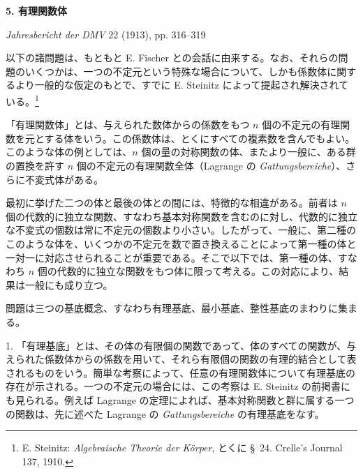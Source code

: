 \documentclass[11pt]{jlreq}
\begin{document}
\providecommand{\Kfield}{\mathfrak{K}}
\providecommand{\Ssys}{\mathfrak{S}}
\providecommand{\Mfield}{\mathfrak{M}}
\providecommand{\tq}{\tau}
\providecommand{\Lsys}{\mathfrak{L}}
\providecommand{\Jdom}{\mathfrak{J}}
\providecommand{\ds}{\displaystyle}

\begin{center}
{\Large\bfseries 5. 有理関数体}\par
\vspace{1.2em}
\emph{Jahresbericht der DMV} 22 (1913), pp. 316--319
\end{center}

\vspace{1.5em}

以下の諸問題は、もともと E. Fischer との会話に由来する。なお、それらの問題のいくつかは、一つの不定元という特殊な場合について、しかも係数体に関するより一般的な仮定のもとで、すでに E. Steinitz によって提起され解決されている。\footnote{E. Steinitz: \emph{Algebraische Theorie der Körper}, とくに \S\ 24. Crelle's Journal 137, 1910.}

「有理関数体」とは、与えられた数体からの係数をもつ $n$ 個の不定元の有理関数を元とする体をいう。この係数体は、とくにすべての複素数を含んでもよい。このような体の例としては、$n$ 個の量の対称関数の体、またより一般に、ある群の置換を許す $n$ 個の不定元の有理関数全体（Lagrange の \emph{Gattungsbereiche}）、さらに不変式体がある。

最初に挙げた二つの体と最後の体との間には、特徴的な相違がある。前者は $n$ 個の代数的に独立な関数、すなわち基本対称関数を含むのに対し、代数的に独立な不変式の個数は常に不定元の個数より小さい。したがって、一般に、第二種のこのような体を、いくつかの不定元を数で置き換えることによって第一種の体と一対一に対応させられることが重要である。そこで以下では、第一種の体、すなわち $n$ 個の代数的に独立な関数をもつ体に限って考える。この対応により、結果は一般にも成り立つ。

問題は三つの基底概念、すなわち有理基底、最小基底、整性基底のまわりに集まる。

1. 「有理基底」とは、その体の有限個の関数であって、体のすべての関数が、与えられた係数体からの係数を用いて、それら有限個の関数の有理的結合として表されるものをいう。簡単な考察によって、任意の有理関数体について有理基底の存在が示される。一つの不定元の場合には、この考察は E. Steinitz の前掲書にも見られる。例えば Lagrange の定理によれば、基本対称関数と群に属する一つの関数は、先に述べた Lagrange の \emph{Gattungsbereiche} の有理基底をなす。
\end{document}
